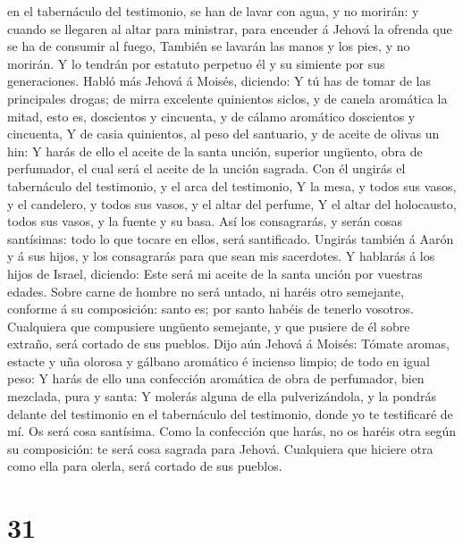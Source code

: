 en el tabernáculo del testimonio, se han de lavar con agua, y no
morirán: y cuando se llegaren al altar para ministrar, para encender á
Jehová la ofrenda que se ha de consumir al fuego, 
También se lavarán las manos y los pies, y no morirán. Y lo tendrán por
estatuto perpetuo él y su simiente por sus generaciones. 
Habló más Jehová á Moisés, diciendo:  Y tú has de tomar
de las principales drogas; de mirra excelente quinientos siclos, y de
canela aromática la mitad, esto es, doscientos y cincuenta, y de cálamo
aromático doscientos y cincuenta,  Y de casia quinientos,
al peso del santuario, y de aceite de olivas un hin:  Y
harás de ello el aceite de la santa unción, superior ungüento, obra de
perfumador, el cual será el aceite de la unción sagrada. 
Con él ungirás el tabernáculo del testimonio, y el arca del testimonio,
 Y la mesa, y todos sus vasos, y el candelero, y todos
sus vasos, y el altar del perfume,  Y el altar del
holocausto, todos sus vasos, y la fuente y su basa.  Así
los consagrarás, y serán cosas santísimas: todo lo que tocare en ellos,
será santificado.  Ungirás también á Aarón y á sus hijos,
y los consagrarás para que sean mis sacerdotes.  Y
hablarás á los hijos de Israel, diciendo: Este será mi aceite de la
santa unción por vuestras edades.  Sobre carne de hombre
no será untado, ni haréis otro semejante, conforme á su composición:
santo es; por santo habéis de tenerlo vosotros. 
Cualquiera que compusiere ungüento semejante, y que pusiere de él sobre
extraño, será cortado de sus pueblos.  Dijo aún Jehová á
Moisés: Tómate aromas, estacte y uña olorosa y gálbano aromático é
incienso limpio; de todo en igual peso:  Y harás de ello
una confección aromática de obra de perfumador, bien mezclada, pura y
santa:  Y molerás alguna de ella pulverizándola, y la
pondrás delante del testimonio en el tabernáculo del testimonio, donde
yo te testificaré de mí. Os será cosa santísima.  Como la
confección que harás, no os haréis otra según su composición: te será
cosa sagrada para Jehová.  Cualquiera que hiciere otra
como ella para olerla, será cortado de sus pueblos.

\hypertarget{section-30}{%
\section{31}\label{section-30}}

